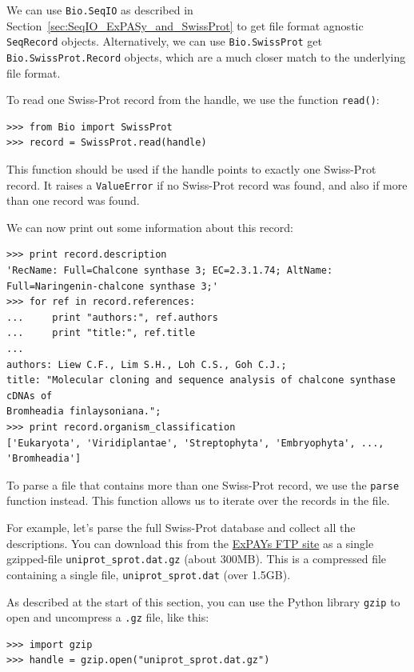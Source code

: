 \documentclass{report}
\begin{document}
We can use \verb+Bio.SeqIO+ as described in Section~\ref{sec:SeqIO_ExPASy_and_SwissProt} to get file format agnostic \verb|SeqRecord| objects.  Alternatively, we can use \verb+Bio.SwissProt+ get \verb|Bio.SwissProt.Record| objects, which are a much closer match to the underlying file format.

To read one Swiss-Prot record from the handle, we use the function \verb|read()|:
\begin{verbatim}
>>> from Bio import SwissProt
>>> record = SwissProt.read(handle)
\end{verbatim}
This function should be used if the handle points to exactly one Swiss-Prot record. It raises a \verb|ValueError| if no Swiss-Prot record was found, and also if more than one record was found.

We can now print out some information about this record:
\begin{verbatim}
>>> print record.description
'RecName: Full=Chalcone synthase 3; EC=2.3.1.74; AltName: Full=Naringenin-chalcone synthase 3;'
>>> for ref in record.references:
...     print "authors:", ref.authors
...     print "title:", ref.title
...
authors: Liew C.F., Lim S.H., Loh C.S., Goh C.J.;
title: "Molecular cloning and sequence analysis of chalcone synthase cDNAs of
Bromheadia finlaysoniana.";
>>> print record.organism_classification
['Eukaryota', 'Viridiplantae', 'Streptophyta', 'Embryophyta', ..., 'Bromheadia']
\end{verbatim}

To parse a file that contains more than one Swiss-Prot record, we use the \verb|parse| function instead. This function allows us to iterate over the records in the file.

For example, let's parse the full Swiss-Prot database and collect all the descriptions.
You can download this from the \href{ftp://ftp.expasy.org/databases/uniprot/current_release/knowledgebase/complete/uniprot_sprot.dat.gz}{ExPAYs FTP site} as a single gzipped-file \verb|uniprot_sprot.dat.gz| (about 300MB).  This is a compressed file containing a single file, \verb|uniprot_sprot.dat| (over 1.5GB).

As described at the start of this section, you can use the Python library \verb|gzip| to open and uncompress a \texttt{.gz} file, like this:

\begin{verbatim}
>>> import gzip
>>> handle = gzip.open("uniprot_sprot.dat.gz")
\end{verbatim}
\end{document}
